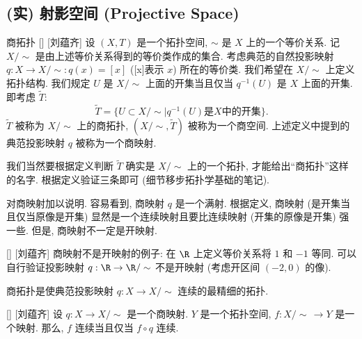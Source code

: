 \documentclass[UTF8]{ctexart}
\begin{document}
    \subsection{(实) 射影空间 (Projective Space)}

        \begin{dfn}
            []
            {商拓扑}
            []
            [刘蕴齐]
            设 \((X,T)\) 是一个拓扑空间,  \(\sim\) 是 \(X\) 上的一个等价关系. 记 \(X / \sim\) 是由上述等价关系得到的等价类作成的集合. 
            考虑典范的自然投影映射 \(q: X \rightarrow X/\sim: q(x) = [x]\) ([x]表示 \(x\)) 所在的等价类. 
            我们希望在 \(X / \sim\) 上定义拓扑结构. 我们规定 \(U\) 是 \(X / \sim\) 上面的开集当且仅当 \(q^{-1}(U)\) 是 \(X\) 上面的开集. 即考虑 \(\tilde{T}\):
            \[
                \tilde{T} = \{ U \subset X/\sim | q^{-1}(U) \text{是} X \text{中的开集} \}.
            \]
             \(\tilde{T}\) 被称为 \(X/\sim\) 上的商拓扑,  \((X/\sim,\tilde{T})\) 被称为一个商空间. 上述定义中提到的典范投影映射 \(q\) 被称为一个商映射. 
        \end{dfn}

        \begin{rmk}
            []
            我们当然要根据定义判断 \(\tilde{T}\) 确实是 \(X/\sim\) 上的一个拓扑, 才能给出``商拓扑''这样的名字. 根据定义验证三条即可 (细节移步拓扑学基础的笔记). 
        \end{rmk}

        
        \begin{rmk}
            []
            对商映射加以说明. 容易看到, 商映射 \(q\) 是一个满射. 根据定义, 商映射 (是开集当且仅当原像是开集) 显然是一个连续映射且要比连续映射 (开集的原像是开集) 强一些. 但是, 商映射不一定是开映射. 
        \end{rmk}

        \begin{cxmp}
            []
            {}
            []
            [刘蕴齐]
            商映射不是开映射的例子: 在 \(\R\) 上定义等价关系将 \(1\) 和 \(-1\) 等同. 可以自行验证投影映射 \(q: \R \rightarrow \R/\sim\) 不是开映射 (考虑开区间 \((-2,0)\) 的像). 
        \end{cxmp}
        
        \begin{rmk}
            []
            商拓扑是使典范投影映射 \(q: X \rightarrow X/\sim\) 连续的最精细的拓扑. 
        \end{rmk}

        \begin{lma}
            []
            {}
            []
            [刘蕴齐]
            设 \(q: X \rightarrow X/\sim\) 是一个商映射.  \(Y\) 是一个拓扑空间, \(f: X/\sim \, \rightarrow Y\) 是一个映射. 那么,  \(f\) 连续当且仅当 \(f \circ q\) 连续.    
        \end{lma}
\end{document}
